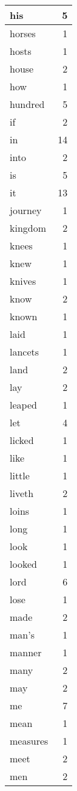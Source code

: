 \begin{center}
\begin{longtable}{l|r}
his & 5\\ \hline 
horses & 1\\ \hline 
hosts & 1\\ \hline 
house & 2\\ \hline 
how & 1\\ \hline 
hundred & 5\\ \hline 
if & 2\\ \hline 
in & 14\\ \hline 
into & 2\\ \hline 
is & 5\\ \hline 
it & 13\\ \hline 
journey & 1\\ \hline 
kingdom & 2\\ \hline 
knees & 1\\ \hline 
knew & 1\\ \hline 
knives & 1\\ \hline 
know & 2\\ \hline 
known & 1\\ \hline 
laid & 1\\ \hline 
lancets & 1\\ \hline 
land & 2\\ \hline 
lay & 2\\ \hline 
leaped & 1\\ \hline 
let & 4\\ \hline 
licked & 1\\ \hline 
like & 1\\ \hline 
little & 1\\ \hline 
liveth & 2\\ \hline 
loins & 1\\ \hline 
long & 1\\ \hline 
look & 1\\ \hline 
looked & 1\\ \hline 
lord & 6\\ \hline 
lose & 1\\ \hline 
made & 2\\ \hline 
man's & 1\\ \hline 
manner & 1\\ \hline 
many & 2\\ \hline 
may & 2\\ \hline 
me & 7\\ \hline 
mean & 1\\ \hline 
measures & 1\\ \hline 
meet & 2\\ \hline 
men & 2\\ \hline 

\end{longtable}
\end{center}
